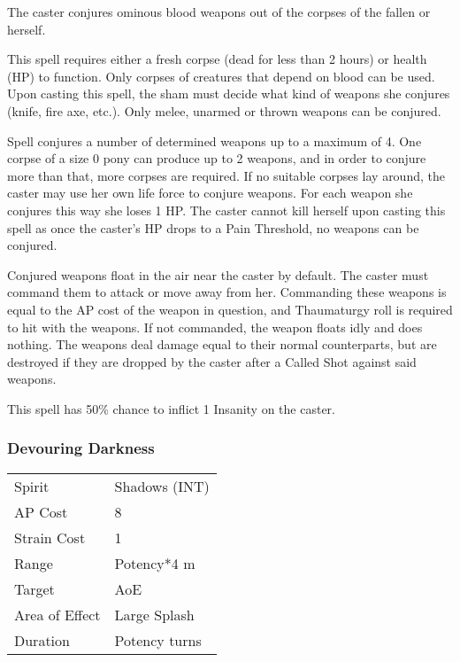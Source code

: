 \documentclass[11pt,a4paper,twocolumn]{book}
\begin{document}
\medskip

The caster conjures ominous blood weapons out of the corpses of the fallen or herself.

This spell requires either a fresh corpse (dead for less than 2 hours) or health (HP) to function. Only corpses of creatures that depend on blood can be used. Upon casting this spell, the sham must decide what kind of weapons she conjures (knife, fire axe, etc.). Only melee, unarmed or thrown weapons can be conjured.

Spell conjures a number of determined weapons up to a maximum of 4. One corpse of a size 0 pony can produce up to 2 weapons, and in order to conjure more than that, more corpses are required. If no suitable corpses lay around, the caster may use her own life force to conjure weapons. For each weapon she conjures this way she loses 1 HP. The caster cannot kill herself upon casting this spell as once the caster's HP drops to a Pain Threshold, no weapons can be conjured.

Conjured weapons float in the air near the caster by default. The caster must command them to attack or move away from her. Commanding these weapons is equal to the AP cost of the weapon in question, and Thaumaturgy roll is required to hit with the weapons. If not commanded, the weapon floats idly and does nothing. The weapons deal damage equal to their normal counterparts, but are destroyed if they are dropped by the caster after a Called Shot against said weapons.

This spell has 50\% chance to inflict 1 Insanity on the caster.


\subsubsection*{Devouring Darkness}
{
	\begin{tabu} to 75mm{| X[l,4] | X[l,7] |}
		\hline
		Spirit 			& Shadows (INT) 	\\
		AP Cost	      	& 8 				\\
		Strain Cost     & 1 				\\
		Range     		& Potency*4 m		\\
		Target      	& AoE				\\
		Area of Effect  & Large Splash  	 	\\
		Duration     	& Potency turns 	\\ \hline
	\end{tabu}
	
}
\end{document}
